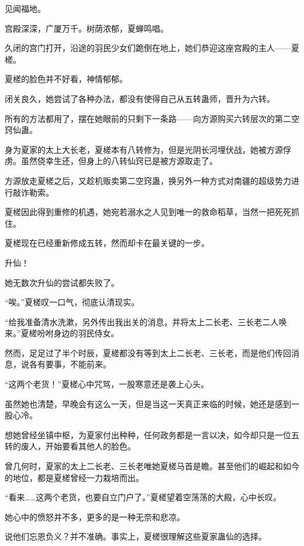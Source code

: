 
\begin{this_body}



见闻福地。

宫殿深深，广厦万千。树荫浓郁，夏蝉鸣唱。

久闭的宫门打开，沿途的羽民少女们跪倒在地上，她们恭迎这座宫殿的主人——夏槎。

夏槎的脸色并不好看，神情郁郁。

闭关良久，她尝试了各种办法，都没有使得自己从五转蛊师，晋升为六转。

所有的方法都用了，摆在她眼前的只剩下一条路——向方源购买六转层次的第二空窍仙蛊。

身为夏家的太上大长老，夏槎本有八转修为，但是光阴长河埋伏战，她被方源俘虏。虽然侥幸生还，但身上的八转仙窍已是被方源取走了。

方源放走夏槎之后，又趁机贩卖第二空窍蛊，换另外一种方式对南疆的超级势力进行敲诈勒索。

夏槎因此得到重修的机遇，她宛若溺水之人见到唯一的救命稻草，当然一把死死抓住。

夏槎现在已经重新修成五转，然而却卡在最关键的一步。

升仙！

她无数次升仙的尝试都失败了。

“唉。”夏槎叹一口气，彻底认清现实。

“给我准备清水洗漱，另外传出我出关的消息，并将太上二长老、三长老二人唤来。”夏槎吩咐身边的羽民侍女。

然而，足足过了半个时辰，夏槎都没有等到太上二长老、三长老，而是他们传回消息，说各有要事，不能前来。

“这两个老货！”夏槎心中咒骂，一股寒意还是袭上心头。

虽然她也清楚，早晚会有这么一天，但是当这一天真正来临的时候，她还是感到一股心冷。

想她曾经坐镇中枢，为夏家付出种种，任何政务都是一言以决，如今却只是一位五转的废人，开始要看其他人的脸色。

曾几何时，夏家的太上二长老、三长老唯她夏槎马首是瞻。甚至他们的崛起和如今的地位，都是夏槎曾经一力栽培而出。

“看来……这两个老货，也要自立门户了。”夏槎望着空荡荡的大殿，心中长叹。

她心中的愤怒并不多，更多的是一种无奈和悲凉。

说他们忘恩负义？并不准确。事实上，夏槎很理解这些夏家蛊仙的选择。


\end{this_body}

